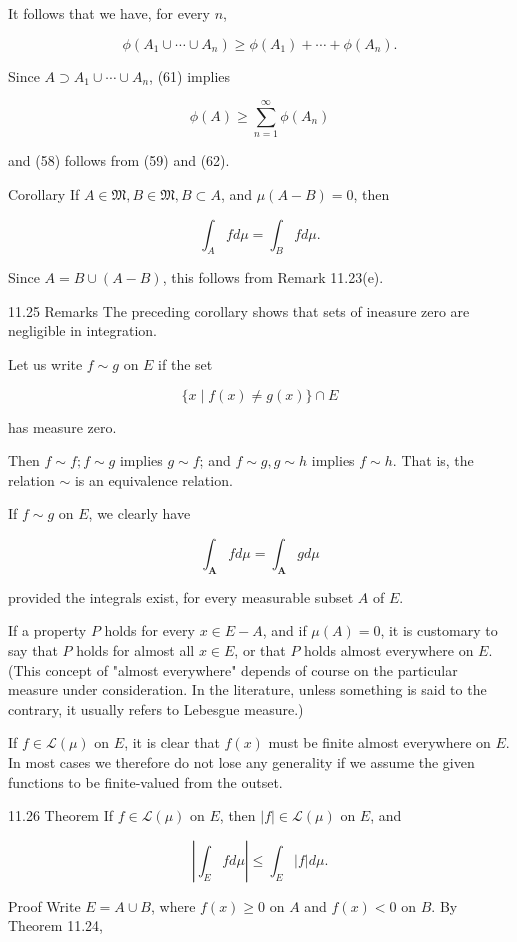 \documentclass[10pt]{article}
\begin{document}
It follows that we have, for every $n$,

$$
\phi\left(A_{1} \cup \cdots \cup A_{n}\right) \geq \phi\left(A_{1}\right)+\cdots+\phi\left(A_{n}\right) .
$$

Since $A \supset A_{1} \cup \cdots \cup A_{n}$, (61) implies

$$
\phi(A) \geq \sum_{n=1}^{\infty} \phi\left(A_{n}\right)
$$

and (58) follows from (59) and (62).

Corollary If $A \in \mathfrak{M}, B \in \mathfrak{M}, B \subset A$, and $\mu(A-B)=0$, then

$$
\int_{A} f d \mu=\int_{B} f d \mu .
$$

Since $A=B \cup(A-B)$, this follows from Remark 11.23(e).

11.25 Remarks The preceding corollary shows that sets of ineasure zero are negligible in integration.

Let us write $f \sim g$ on $E$ if the set

$$
\{x \mid f(x) \neq g(x)\} \cap E
$$

has measure zero.

Then $f \sim f ; f \sim g$ implies $g \sim f$; and $f \sim g, g \sim h$ implies $f \sim h$. That is, the relation $\sim$ is an equivalence relation.

If $f \sim g$ on $E$, we clearly have

$$
\int_{\mathbf{A}} f d \mu=\int_{\mathbf{A}} g d \mu
$$

provided the integrals exist, for every measurable subset $A$ of $E$.

If a property $P$ holds for every $x \in E-A$, and if $\mu(A)=0$, it is customary to say that $P$ holds for almost all $x \in E$, or that $P$ holds almost everywhere on $E$. (This concept of "almost everywhere" depends of course on the particular measure under consideration. In the literature, unless something is said to the contrary, it usually refers to Lebesgue measure.)

If $f \in \mathscr{L}(\mu)$ on $E$, it is clear that $f(x)$ must be finite almost everywhere on $E$. In most cases we therefore do not lose any generality if we assume the given functions to be finite-valued from the outset.

11.26 Theorem If $f \in \mathscr{L}(\mu)$ on $E$, then $|f| \in \mathscr{L}(\mu)$ on $E$, and

$$
\left|\int_{E} f d \mu\right| \leq \int_{E}|f| d \mu .
$$

Proof Write $E=A \cup B$, where $f(x) \geq 0$ on $A$ and $f(x)<0$ on $B$. By Theorem 11.24,
\end{document}
